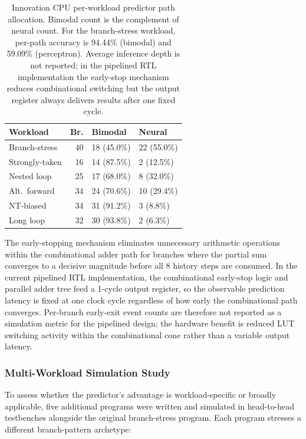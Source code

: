 \documentclass[12pt,a4paper]{article}
\begin{document}
\begin{table}[htbp]
  \centering
  \caption{Innovation CPU per-workload predictor path allocation.
           Bimodal count is the complement of neural count.
           For the branch-stress workload, per-path accuracy is
           94.44\% (bimodal) and 59.09\% (perceptron).
           Average inference depth is not reported; in the pipelined RTL
           implementation the early-stop mechanism reduces combinational
           switching but the output register always delivers results after
           one fixed cycle.}
  \label{tab:internal}
  \begin{tabularx}{\linewidth}{p{2.2cm}rYY}
    \toprule
    \textbf{Workload} & \textbf{Br.}
      & \textbf{Bimodal}
      & \textbf{Neural} \\
    \midrule
    Branch-stress  & 40 & 18 (45.0\%) & 22 (55.0\%) \\
    Strongly-taken & 16 & 14 (87.5\%) &  2 (12.5\%) \\
    Nested loop    & 25 & 17 (68.0\%) &  8 (32.0\%) \\
    Alt.\ forward  & 34 & 24 (70.6\%) & 10 (29.4\%) \\
    NT-biased      & 34 & 31 (91.2\%) &  3 (8.8\%)  \\
    Long loop      & 32 & 30 (93.8\%) &  2 (6.3\%)  \\
    \bottomrule
  \end{tabularx}
\end{table}

The early-stopping mechanism eliminates unnecessary arithmetic operations within
the combinational adder path for branches where the partial sum converges to a
decisive magnitude before all 8 history steps are consumed. In the current
pipelined RTL implementation, the combinational early-stop logic and parallel
adder tree feed a 1-cycle output register, so the observable prediction latency
is fixed at one clock cycle regardless of how early the combinational path
converges. Per-branch early-exit event counts are therefore not reported
as a simulation metric for the pipelined design; the hardware benefit is
reduced LUT switching activity within the combinational cone rather than
a variable output latency.

\subsubsection{Multi-Workload Simulation Study}
\label{sec:multiworkload}

To assess whether the predictor's advantage is workload-specific or broadly
applicable, five additional programs were written and simulated in head-to-head
testbenches alongside the original branch-stress program. Each program stresses
a different branch-pattern archetype:
\end{document}
